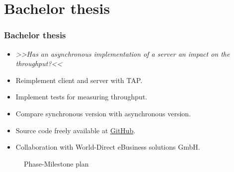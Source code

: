 \documentclass[11pt,t,usepdftitle=false,aspectratio=169,usenames,dvipsnames]{beamer}
\begin{document}
    \section{Bachelor thesis}
    \begin{frame}
        \frametitle{Bachelor thesis}

        \begin{itemize}
            \item<1-> \textcolor{uibkblue}{\textit{>>Has an asynchronous implementation of a server an impact on the throughput?<<}}
            \item<2-> Reimplement client and server with TAP.
            \item<3-> Implement tests for measuring throughput.
            \item<4-> Compare synchronous version with asynchronous version.
            \item<5-> Source code freely available at \href{https://github.com/world-direct/CoAP.NET}{GitHub}.
            \item<6-> Collaboration with World-Direct eBusiness solutions GmbH.
        \end{itemize}
        \begin{figure}[ht]
            \caption{Phase-Milestone plan}
            \label{figure:phase-milestone-plan}
        \end{figure}
    \end{frame}
\end{document}
